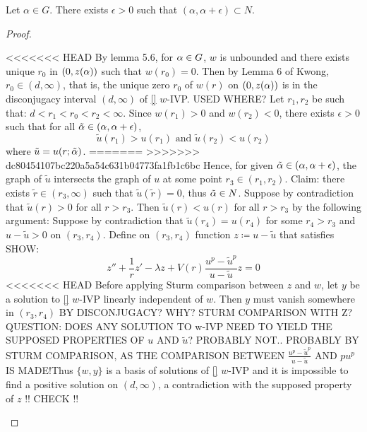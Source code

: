
\begin{lemma}
	Let $\alpha\in G$.
	There exists $\epsilon>0$ such that $(\alpha,\alpha+\epsilon)\subset N$.
\begin{proof}

\begin{outline}
<<<<<<< HEAD
	\1 By lemma 5.6, for $\alpha\in G$, $w$ is unbounded and there exists unique $r_0$ in $(0,z(\alpha))$ such that $w(r_0)=0$.
	\1 Then by Lemma 6 of Kwong, $r_0\in(d,\infty)$, that is, the unique zero $r_0$ of $w(r)$ on $(0,z(\alpha))$ is in the disconjugacy interval $(d,\infty)$ of \ref{} $w$-IVP. USED WHERE?
	\1 Let $r_1,r_2$ be such that: $d<r_1<r_0<r_2<\infty$. Since $w(r_1)>0$ and $w(r_2)<0$, there exists $\epsilon>0$ such that for all $\tilde{\alpha}\in(\alpha,\alpha+\epsilon)$, $$ \tilde u(r_1) > u(r_1) \text{ and } \tilde u(r_2)<u(r_2) $$ where $\tilde u = u(r;\tilde{\alpha})$.
=======
>>>>>>> dc80454107bc220a5a54c631b04773fa1fb1c6bc
	\1 Hence, for given $\tilde{\alpha}\in(\alpha,\alpha+\epsilon)$, the graph of $\tilde u$ intersects the graph of $u$ at some point $r_3\in(r_1,r_2)$.
	\1 Claim: there exists $\tilde r\in(r_3,\infty)$ such that $\tilde u(\tilde r)=0$, thus $\tilde{\alpha}\in N$.
		\2 Suppose by contradiction that $\tilde u(r)>0$ for all $r>r_3$.
		\2 Then $\tilde u(r)<u(r)$ for all $r>r_3$ by the following argument:
			\3 Suppose by contradiction that $\tilde u(r_4)=u(r_4)$ for some $r_4>r_3$ and $u-\tilde u>0$ on $(r_3,r_4)$.
			\3 Define on $(r_3,r_4)$ function $z\coloneqq u-\tilde u$ that satisfies SHOW: $$ z'' + \frac{1}{r}z' -\lambda z + V(r)\frac{u^p-\tilde u^p}{u-\tilde u}z = 0 $$
<<<<<<< HEAD
			\3 Before applying Sturm comparison between $z$ and $w$, let $y$ be a solution to \ref{} $w$-IVP linearly independent of $w$. Then $y$ must vanish somewhere in $(r_3,r_4)$ BY DISCONJUGACY? WHY? STURM COMPARISON WITH Z? QUESTION: DOES ANY SOLUTION TO w-IVP NEED TO YIELD THE SUPPOSED PROPERTIES OF $u$ AND $\tilde u$? PROBABLY NOT.. PROBABLY BY STURM COMPARISON, AS THE COMPARISON BETWEEN $\frac{u^p-\tilde u^p}{u-\tilde u}$ AND $pu^p$ IS MADE!Thus $\{w,y\}$ is a basis of solutions of \ref{} $w$-IVP and it is impossible to find a positive solution on $(d,\infty)$, a contradiction with the supposed property of $z$ !! CHECK !!

\end{outline}
\end{proof}
\end{lemma}
